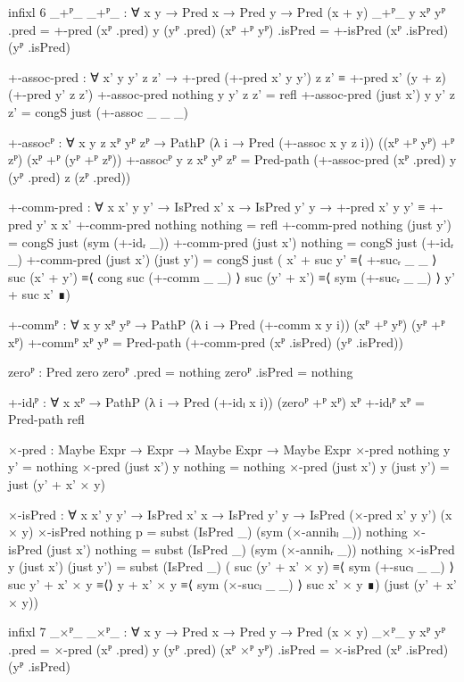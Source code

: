 \begin{code}[hide]
  infixl 6 _+ᴾ_
  _+ᴾ_ : ∀ {x y} → Pred x → Pred y → Pred (x + y)
  _+ᴾ_ {y} xᴾ yᴾ .pred = +-pred (xᴾ .pred) y (yᴾ .pred)
  (xᴾ +ᴾ yᴾ) .isPred = +-isPred (xᴾ .isPred) (yᴾ .isPred)

  +-assoc-pred :
    ∀ x' y y' z z' →
    +-pred (+-pred x' y y') z z' ≡ +-pred x' (y + z) (+-pred y' z z')
  +-assoc-pred nothing y y' z z' = refl
  +-assoc-pred (just x') y y' z z' = congS just (+-assoc _ _ _)

  +-assocᴾ :
    ∀ {x y z} xᴾ yᴾ zᴾ →
    PathP (λ i → Pred (+-assoc x y z i)) ((xᴾ +ᴾ yᴾ) +ᴾ zᴾ) (xᴾ +ᴾ (yᴾ +ᴾ zᴾ))
  +-assocᴾ {y} {z} xᴾ yᴾ zᴾ =
    Pred-path (+-assoc-pred (xᴾ .pred) y (yᴾ .pred) z (zᴾ .pred))

  +-comm-pred :
    ∀ {x x' y y'} → IsPred x' x → IsPred y' y →
    +-pred x' y y' ≡ +-pred y' x x'
  +-comm-pred nothing nothing = refl
  +-comm-pred nothing (just y') = congS just (sym (+-idᵣ _))
  +-comm-pred (just x') nothing = congS just (+-idᵣ _)
  +-comm-pred (just x') (just y') =
    congS just
      ( x' + suc y'   ≡⟨ +-sucᵣ _ _ ⟩
        suc (x' + y') ≡⟨ cong suc (+-comm _ _) ⟩
        suc (y' + x') ≡⟨ sym (+-sucᵣ _ _) ⟩
        y' + suc x'   ∎)

  +-commᴾ :
    ∀ {x y} xᴾ yᴾ → PathP (λ i → Pred (+-comm x y i)) (xᴾ +ᴾ yᴾ) (yᴾ +ᴾ xᴾ)
  +-commᴾ xᴾ yᴾ = Pred-path (+-comm-pred (xᴾ .isPred) (yᴾ .isPred))

  zeroᴾ : Pred zero
  zeroᴾ .pred = nothing
  zeroᴾ .isPred = nothing

  +-idₗᴾ : ∀ {x} xᴾ → PathP (λ i → Pred (+-idₗ x i)) (zeroᴾ +ᴾ xᴾ) xᴾ
  +-idₗᴾ xᴾ = Pred-path refl

  ×-pred : Maybe Expr → Expr → Maybe Expr → Maybe Expr
  ×-pred nothing y y' = nothing
  ×-pred (just x') y nothing = nothing
  ×-pred (just x') y (just y') = just (y' + x' × y)

  ×-isPred :
    ∀ {x x' y y'} →
    IsPred x' x → IsPred y' y → IsPred (×-pred x' y y') (x × y)
  ×-isPred nothing p = subst (IsPred _) (sym (×-annihₗ _)) nothing
  ×-isPred (just x') nothing = subst (IsPred _) (sym (×-annihᵣ _)) nothing
  ×-isPred {y} (just x') (just y') =
    subst (IsPred _)
      ( suc (y' + x' × y) ≡⟨ sym (+-sucₗ _ _) ⟩
        suc y' + x' × y   ≡⟨⟩
        y + x' × y         ≡⟨ sym (×-sucₗ _ _) ⟩
        suc x' × y         ∎)
      (just (y' + x' × y))

  infixl 7 _×ᴾ_
  _×ᴾ_ : ∀ {x y} → Pred x → Pred y → Pred (x × y)
  _×ᴾ_ {y} xᴾ yᴾ .pred = ×-pred (xᴾ .pred) y (yᴾ .pred)
  (xᴾ ×ᴾ yᴾ) .isPred = ×-isPred (xᴾ .isPred) (yᴾ .isPred)


\end{code}
